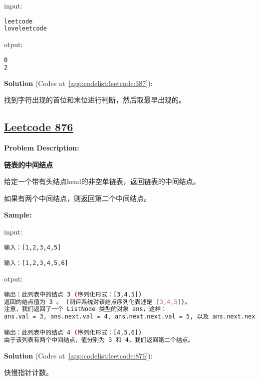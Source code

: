 input:\par

\begin{lstlisting}[language=bash]
leetcode
loveleetcode
\end{lstlisting}

otput:\par

\begin{lstlisting}[language=bash]
0
2
\end{lstlisting}

\textbf{Solution }(Codes at~\ref{app:codelist:leetcode:387}):\par

找到字符出现的首位和末位进行判断，然后取最早出现的。\par



\subsection{\href{https://leetcode-cn.com/}{Leetcode 876}}\label{app:problemlist:leetcode:876}

\textbf{Problem Description:}\par

\textbf{链表的中间结点}\par

给定一个带有头结点head的非空单链表，返回链表的中间结点。\par

如果有两个中间结点，则返回第二个中间结点。\par


\textbf{Sample:}\par

input:\par

\begin{lstlisting}[language=bash]
输入：[1,2,3,4,5]

输入：[1,2,3,4,5,6]
\end{lstlisting}

otput:\par

\begin{lstlisting}[language=bash]
输出：此列表中的结点 3 (序列化形式：[3,4,5])
返回的结点值为 3 。 (测评系统对该结点序列化表述是 [3,4,5])。
注意，我们返回了一个 ListNode 类型的对象 ans，这样：
ans.val = 3, ans.next.val = 4, ans.next.next.val = 5, 以及 ans.next.next.next = NULL.

输出：此列表中的结点 4 (序列化形式：[4,5,6])
由于该列表有两个中间结点，值分别为 3 和 4，我们返回第二个结点。
\end{lstlisting}

\textbf{Solution }(Codes at~\ref{app:codelist:leetcode:876}):\par

快慢指针计数。\par



